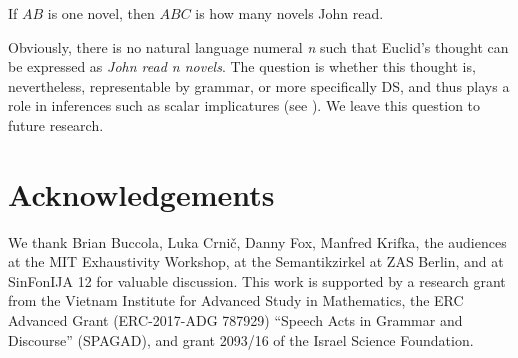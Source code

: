 \documentclass[output=paper]{langscibook}
\begin{document}
\ea
If $AB$ is one novel, then $ABC$ is how many novels John read.
\label{hai-tri:euclid}
\z

\noindent Obviously, there is no natural language numeral \textit{n} such that Euclid's thought can be expressed as \textit{John read n novels}. The question is whether this thought is, nevertheless, representable by grammar, or more specifically DS, and thus plays a role in inferences such as scalar implicatures (see ). We leave this question to future research.


\section*{Acknowledgements}
We thank Brian Buccola, Luka Crni\v{c}, Danny Fox, Manfred Krifka, the audiences at the MIT Exhaustivity Workshop, at the Semantikzirkel at ZAS Berlin, and at SinFonIJA 12 for valuable discussion. This work is supported by a research grant from the Vietnam Institute for Advanced Study in Mathematics, the ERC Advanced Grant (ERC-2017-ADG 787929) ``Speech Acts in Grammar and Discourse'' (SPAGAD), and grant 2093/16 of the Israel Science Foundation.

{\sloppy\printbibliography[heading=subbibliography,notkeyword=this]}
\end{document}
